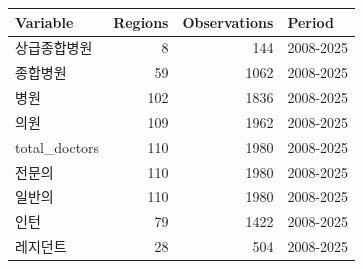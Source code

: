 \begin{tabular}{lrrl}
\toprule
Variable & Regions & Observations & Period\\
\midrule
상급종합병원 & 8 & 144 & 2008-2025\\
종합병원 & 59 & 1062 & 2008-2025\\
병원 & 102 & 1836 & 2008-2025\\
의원 & 109 & 1962 & 2008-2025\\
total\_doctors & 110 & 1980 & 2008-2025\\
전문의 & 110 & 1980 & 2008-2025\\
일반의 & 110 & 1980 & 2008-2025\\
인턴 & 79 & 1422 & 2008-2025\\
레지던트 & 28 & 504 & 2008-2025\\
\bottomrule
\end{tabular}
